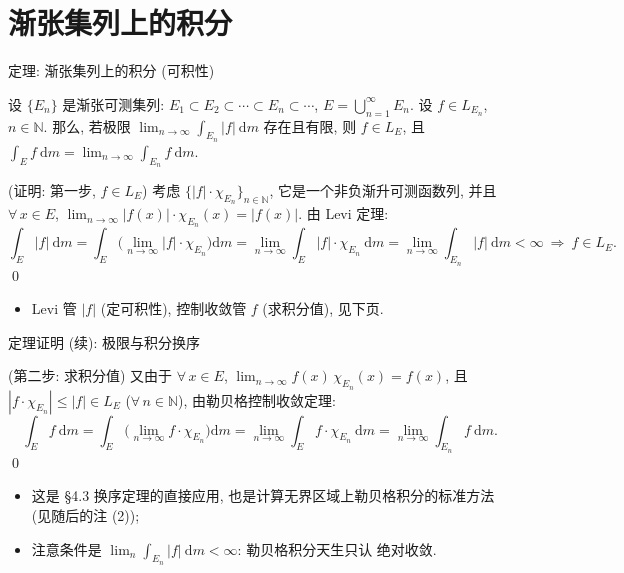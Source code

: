 
\section[渐张集列]{渐张集列上的积分}


\begin{frame}{定理: 渐张集列上的积分 (可积性)}

\begin{thm}
设 $\{E_n\}$ 是渐张可测集列: $E_1 \subset E_2 \subset \cdots \subset E_n \subset \cdots$,
$E = \bigcup_{n=1}^{\infty} E_n$. 设 $f \in L_{E_n}$, $n \in \mathbb{N}$.
那么, 若极限 $\displaystyle \lim_{n \to \infty} \int_{E_n} |f| ~ \mathrm{d} m$ 存在且有限,
则 $f \in L_E$, 且 $\displaystyle \int_E f ~ \mathrm{d} m = \lim_{n \to \infty} \int_{E_n} f ~ \mathrm{d} m$.
\end{thm}

\startproof[bg=yellow, fg=red](证明: 第一步, $f \in L_E$)
考虑 $\big\{ |f| \cdot \chi_{E_n} \big\}_{n \in \mathbb{N}}$, 它是一个\alert{非负渐升}可测函数列,
并且 $\forall\, x \in E$,
$\displaystyle \lim_{n \to \infty} |f(x)| \cdot \chi_{E_n}(x) = |f(x)|$.
由 \alert{Levi 定理}:
\[
\int_E |f| ~ \mathrm{d} m
= \int_E \Big( \lim_{n \to \infty} |f| \cdot \chi_{E_n} \Big) \mathrm{d} m
= \lim_{n \to \infty} \int_E |f| \cdot \chi_{E_n} ~ \mathrm{d} m
= \lim_{n \to \infty} \int_{E_n} |f| ~ \mathrm{d} m
< \infty
\ \Longrightarrow\ f \in L_E .
\]
\qed

\pause

\begin{itemize}
\item Levi 管 $|f|$ (定\alert{可积性}), 控制收敛管 $f$ (求\alert{积分值}),
  见下页.
\end{itemize}

\end{frame}


\begin{frame}{定理证明 (续): 极限与积分换序}

\startproof[bg=yellow, fg=red](第二步: 求积分值)
又由于 $\forall\, x \in E$,
$\displaystyle \lim_{n \to \infty} f(x)\, \chi_{E_n}(x) = f(x)$,
且 $|f \cdot \chi_{E_n}| \leqslant |f| \in L_E$ ($\forall\, n \in \mathbb{N}$),
由勒贝格\alert{控制收敛定理}:
\[
\int_E f ~ \mathrm{d} m
= \int_E \Big( \lim_{n \to \infty} f \cdot \chi_{E_n} \Big) \mathrm{d} m
= \lim_{n \to \infty} \int_E f \cdot \chi_{E_n} ~ \mathrm{d} m
= \lim_{n \to \infty} \int_{E_n} f ~ \mathrm{d} m .
\]
\qed

\pause

\begin{itemize}
\item 这是 \S 4.3 换序定理的直接应用, 也是计算\alert{无界区域}上勒贝格积分的标准方法
  (见随后的注 (2));
\item 注意条件是 $\lim_n \int_{E_n} |f| ~ \mathrm{d} m < \infty$: 勒贝格积分天生只认
  \alert{绝对收敛}.
\end{itemize}

\end{frame}

